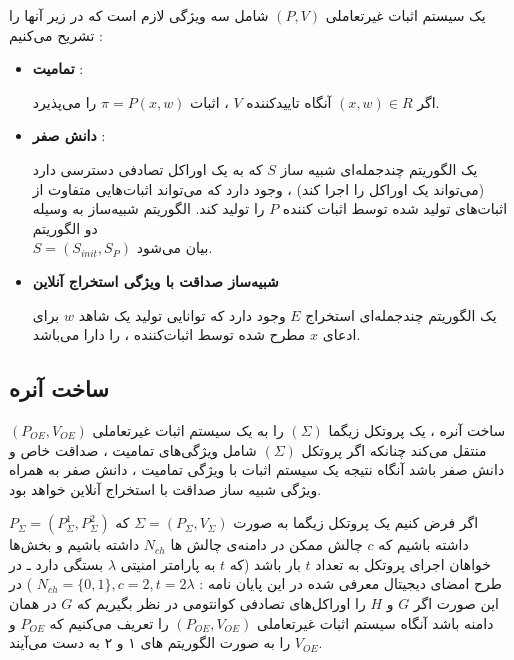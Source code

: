 \documentclass[12pt,a4paper]{article}
\begin{document}
یک سیستم اثبات غیرتعاملی 
$(P,V)$
شامل سه ویژگی لازم است که در زیر آنها را تشریح می‌کنیم :
\begin{itemize}
	
	\item[]{\bf تمامیت} :
	
	‌اگر 
	$(x,w) \in R$
	آنگاه تاییدکننده 
	$V$
	، اثبات 
	$\pi = P(x,w)$
	را می‌پذیرد. 
	
	\item[]{\bf دانش صفر} :
	
	یک الگوریتم چندجمله‌ای شبیه ساز 
	$S$
	که به یک اوراکل تصادفی دسترسی دارد (می‌تواند یک اوراکل را اجرا کند) ، وجود دارد که می‌تواند اثبات‌هایی متفاوت از اثبات‌های تولید شده توسط اثبات کننده
	$P$
	 را تولید کند. الگوریتم شبیه‌ساز به وسیله دو الگوریتم  \\
	 $S = (S_{init} , S_P)$
	 بیان می‌شود.
	 
	 \item[]{\bf شبیه‌ساز صداقت با ویژگی استخراج آنلاین }
	
	یک الگوریتم چندجمله‌ای استخراج
	$E$
	وجود دارد که توانایی تولید یک شاهد 
	$w$
	برای ادعای 
	$x$
	مطرح شده توسط اثبات‌کننده ، را دارا می‌باشد.
\end{itemize}

\newpage

\subsection{ساخت آنره}\label{unruh_constuction}

ساخت آنره ، یک پروتکل زیگما 
$(\Sigma)$
را به یک سیستم اثبات غیرتعاملی 
$(P_{OE}, V_{OE})$
منتقل می‌کند چنانکه اگر پروتکل 
$(\Sigma)$
شامل ویژگی‌های تمامیت ، صداقت خاص و دانش صفر باشد آنگاه نتیجه یک سیستم اثبات با ویژگی تمامیت ، دانش صفر به همراه ویژگی شبیه ‌ساز صداقت با استخراج آنلاین خواهد بود.

اگر فرض کنیم یک پروتکل زیگما به صورت 
$\Sigma = (P_\Sigma , V_\Sigma)$
که
$P_\Sigma = (P_\Sigma^1 , P_\Sigma^2)$
داشته باشیم که 
$c$
 چالش ممکن در دامنه‌ی چالش ها 
$N_{ch}$
داشته باشیم و بخش‌ها  خواهان اجرای پروتکل به تعداد 
$t$
بار باشد (که 
$t$
به پارامتر امنیتی
$\lambda$
بستگی دارد ـ در طرح امضای دیجیتال معرفی شده در این پایان نامه : 
$N_{ch} = \{0,1\} , c = 2 , t = 2\lambda $ 
)
در این صورت اگر
$G$
و
$H$
را اوراکل‌های تصادفی کوانتومی در نظر بگیریم که 
$G$
در همان دامنه باشد آنگاه سیستم اثبات غیرتعاملی 
$(P_{OE} , V_{OE})$
را تعریف می‌کنیم که 
$P_{OE}$
و
$V_{OE}$
را به صورت الگوریتم های ۱ و ۲ به دست می‌آیند.
\end{document}
